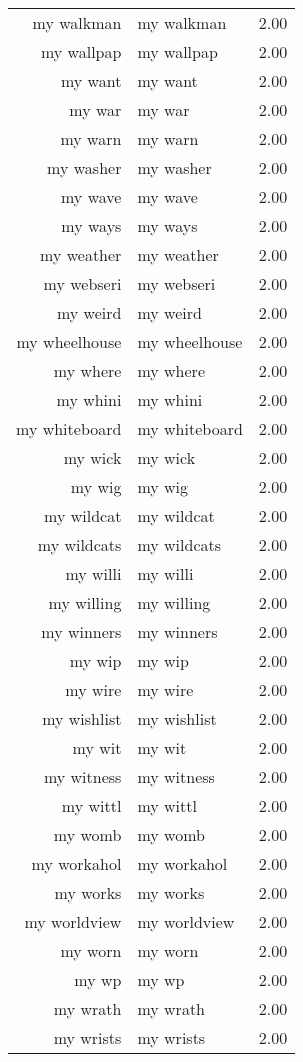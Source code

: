 \begin{table}[ht]
\begin{tabular}{rlr}
  my walkman & my walkman & 2.00 \\ 
  my wallpap & my wallpap & 2.00 \\ 
  my want & my want & 2.00 \\ 
  my war & my war & 2.00 \\ 
  my warn & my warn & 2.00 \\ 
  my washer & my washer & 2.00 \\ 
  my wave & my wave & 2.00 \\ 
  my ways & my ways & 2.00 \\ 
  my weather & my weather & 2.00 \\ 
  my webseri & my webseri & 2.00 \\ 
  my weird & my weird & 2.00 \\ 
  my wheelhouse & my wheelhouse & 2.00 \\ 
  my where & my where & 2.00 \\ 
  my whini & my whini & 2.00 \\ 
  my whiteboard & my whiteboard & 2.00 \\ 
  my wick & my wick & 2.00 \\ 
  my wig & my wig & 2.00 \\ 
  my wildcat & my wildcat & 2.00 \\ 
  my wildcats & my wildcats & 2.00 \\ 
  my willi & my willi & 2.00 \\ 
  my willing & my willing & 2.00 \\ 
  my winners & my winners & 2.00 \\ 
  my wip & my wip & 2.00 \\ 
  my wire & my wire & 2.00 \\ 
  my wishlist & my wishlist & 2.00 \\ 
  my wit & my wit & 2.00 \\ 
  my witness & my witness & 2.00 \\ 
  my wittl & my wittl & 2.00 \\ 
  my womb & my womb & 2.00 \\ 
  my workahol & my workahol & 2.00 \\ 
  my works & my works & 2.00 \\ 
  my worldview & my worldview & 2.00 \\ 
  my worn & my worn & 2.00 \\ 
  my wp & my wp & 2.00 \\ 
  my wrath & my wrath & 2.00 \\ 
  my wrists & my wrists & 2.00 \\ 

\end{tabular}
\end{table}
